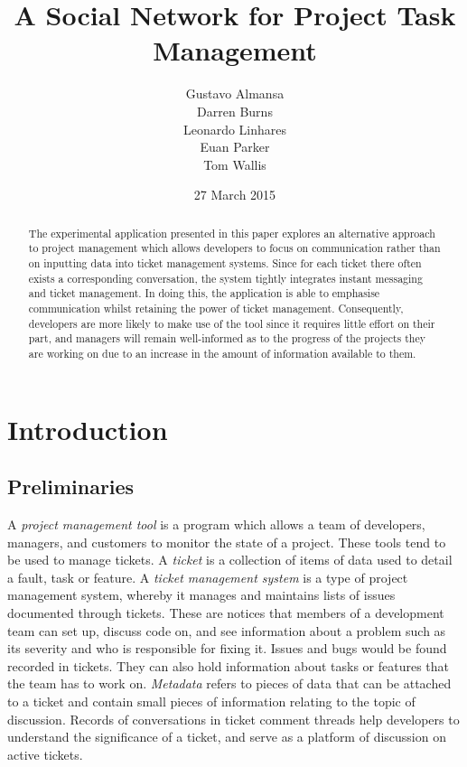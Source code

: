 \documentclass[a4paper]{l3proj}
\begin{document}
\title{A Social Network for Project Task Management}
\author{Gustavo Almansa\\
      Darren Burns \\
      Leonardo Linhares \\
      Euan Parker \\
	  Tom Wallis \\
}
\date{27 March 2015}
\maketitle
\begin{abstract}

The experimental application presented in this paper explores an alternative approach to project management which allows developers to focus on communication rather than on inputting data into ticket management systems. Since for each ticket there often exists a corresponding conversation, the system tightly integrates instant messaging and ticket management. In doing this, the application is able to emphasise  communication whilst retaining the power of ticket management. Consequently, developers are more likely to make use of the tool since it requires little effort on their part, and managers will remain well-informed as to the progress of the projects they are working on due to an increase in the amount of information available to them.

\end{abstract}
\educationalconsent
\tableofcontents
\chapter{Introduction}
\label{intro}

\section{Preliminaries}
\label{preliminaries}
A \textit{project management tool} is a program which allows a team of developers, managers, and customers to monitor the state of a project. These tools tend to be used to manage tickets. A \textit{ticket} is a collection of items of data used to detail a fault, task or feature.  A \textit{ticket management system} is a type of project management system, whereby it manages and maintains lists of issues documented through tickets. These are notices that members of a development team can set up, discuss code on, and see information about a problem such as its severity and who is responsible for fixing it. Issues and bugs would be found recorded in tickets. They can also hold information about tasks or features that the team has to work on. \textit{Metadata} refers to pieces of data that can be attached to a ticket and contain small pieces of information relating to the topic of discussion. Records of conversations in ticket comment threads help developers to understand the significance of a ticket, and serve as a platform of discussion on active tickets.
\end{document}
